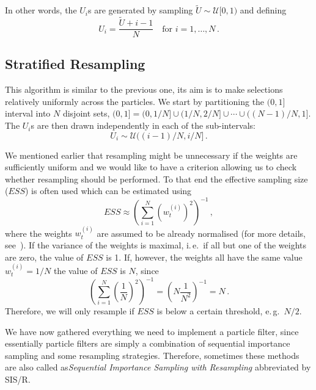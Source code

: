 In other words, the $U_i$s are generated by sampling
$\tilde{U} \sim \mathcal{U}[0, 1)$ and defining
\[
  U_i = \frac{\tilde{U} + i-1}{N} \quad \text{for } i = 1, \dotsc, N
  \,.
\]

\subsection*{Stratified Resampling}
This algorithm is similar to the previous one, its aim is to make
selections relatively uniformly across the particles. We start by
partitioning the $(0,1]$ interval into $N$ disjoint sets,
$(0,1] = (0, 1/N] \cup (1/N, 2/N] \cup \dotsm \cup ((N-1)/N, 1]$. The
$U_i$s are then drawn independently in each of the sub-intervals:
\[
  U_i \sim \mathcal{U}((i-1)/N, i/N]\,.
\]

We mentioned earlier that resampling might be unnecessary if the
weights are sufficiently uniform and we would like to have a criterion
allowing us to check whether resampling should be performed. To that
end the effective sampling size ($ESS$) is often used which can be
estimated using
\[
  ESS \approx {\left( \sum_{i=1}^N {\left( w_t^{(i)} \right)}^2
    \right)}^{-1} \,,
\]
where the weights $w_t^{(i)}$ are assumed to be already normalised
(for more details, see~\cite[179]{arulampalam}). If the variance of
the weights is maximal, i.\,e.\ if all but one of the weights are
zero, the value of $ESS$ is 1. If, however, the weights all have the
same value $w_t^{(i)} = 1/N$ the value of $ESS$ is $N$, since
\[
  {\left( \sum_{i=1}^N {\left( \frac{1}{N} \right)}^2 \right)}^{-1} =
  {\left( N \frac{1}{N^2} \right)}^{-1} = N \,.
\]
Therefore, we will only resample if $ESS$ is below a certain
threshold, e.\,g.\ $N/2$.

We have now gathered everything we need to implement a particle filter,
since essentially particle filters are simply a combination of
sequential importance sampling and some resampling
strategies. Therefore, sometimes these methods are also called
as\emph{Sequential Importance Sampling with Resampling} abbreviated by
SIS/R.
